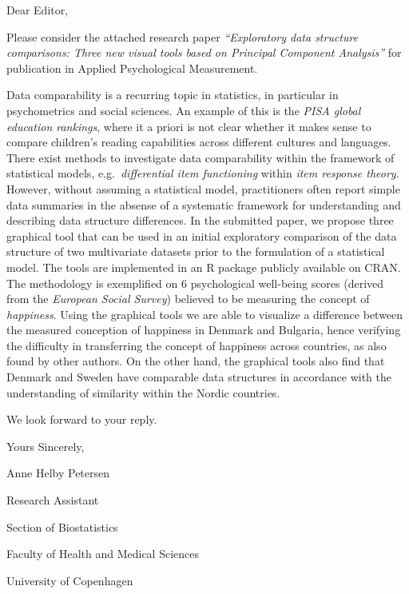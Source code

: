\documentclass[12pt,a4paper]{article}
\begin{document}
Dear Editor,

\medskip

Please consider the attached research paper \emph{``Exploratory data structure comparisons: Three new visual tools based on Principal Component Analysis''} for publication in Applied Psychological Measurement.

\medskip

Data comparability is a recurring topic in statistics, in particular in psychometrics and social sciences. An example of this is the \emph{PISA global education rankings}, where  it a priori is not clear whether it makes sense to compare children's reading capabilities across different cultures and languages. There exist methods to investigate data comparability within the framework of statistical models, e.g.\ \emph{differential item functioning} within \emph{item response theory}. However, without assuming a statistical model, practitioners often report simple data summaries in the absense of a systematic framework for understanding and describing data structure differences. In the submitted paper, we propose three graphical tool that can be used in an initial exploratory comparison of the data structure of two multivariate datasets prior to the formulation of a statistical model. The tools are implemented in an R package publicly available on CRAN. The methodology is exemplified on 6 psychological well-being scores (derived from the \emph{European Social Survey}) believed to be measuring the concept of \emph{happiness}. Using the graphical tools we are able to visualize a difference between the measured conception of happiness in Denmark and Bulgaria, hence verifying the difficulty in transferring the concept of happiness across countries, as also found by other authors. On the other hand, the graphical tools also find that Denmark and Sweden have comparable data structures in accordance with the understanding of similarity within the Nordic countries.

\medskip

We look forward to your reply.

\bigskip

Yours Sincerely,

\bigskip\bigskip

Anne Helby Petersen

Research Assistant

Section of Biostatistics

Faculty of Health and Medical Sciences

University of Copenhagen
\end{document}
